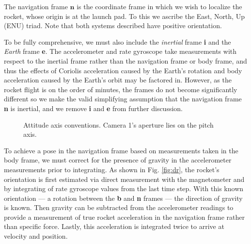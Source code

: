 \documentclass{article}
\begin{document}
The navigation frame $\textbf{n}$ is the coordinate frame in which we wish to localize the rocket, whose origin is at the launch pad. To this we ascribe the East, North, Up (ENU) triad. Note that both systems described have positive orientation. 

To be fully comprehensive, we must also include the \textit{inertial} frame \textbf{i} and the \textit{Earth} frame \textbf{e}. The accelerometer and rate gyroscope take measurements with respect to the inertial frame rather than the navigation frame or body frame, and thus the effects of Coriolis acceleration caused by the Earth's rotation and body acceleration caused by the Earth's orbit may be factored in. However, as the rocket flight is on the order of minutes, the frames do not become significantly different so we make the valid simplifying assumption that the navigation frame \textbf{n} is inertial, and we remove \textbf{i} and \textbf{e} from further discussion.

\begin{figure}[htbp]%
    \centering
    \caption{Attitude axis conventions. Camera 1's aperture lies on the pitch axis.}%
    \label{fig:axes}
\end{figure}

To achieve a pose in the navigation frame based on measurements taken in the body frame, we must correct for the presence of gravity in the accelerometer measurements prior to integrating. As shown in Fig. \ref{fig:dr}, the rocket's orientation is first estimated via direct measurement with the magnetometer and by integrating of rate gyroscope values from the last time step. With this known orientation — a rotation between the \textbf{b} and \textbf{n} frames — the direction of gravity is known. Then gravity can be subtracted from the accelerometer readings to provide a measurement of true rocket acceleration in the navigation frame rather than specific force. Lastly, this acceleration is integrated twice to arrive at velocity and position.
\end{document}
